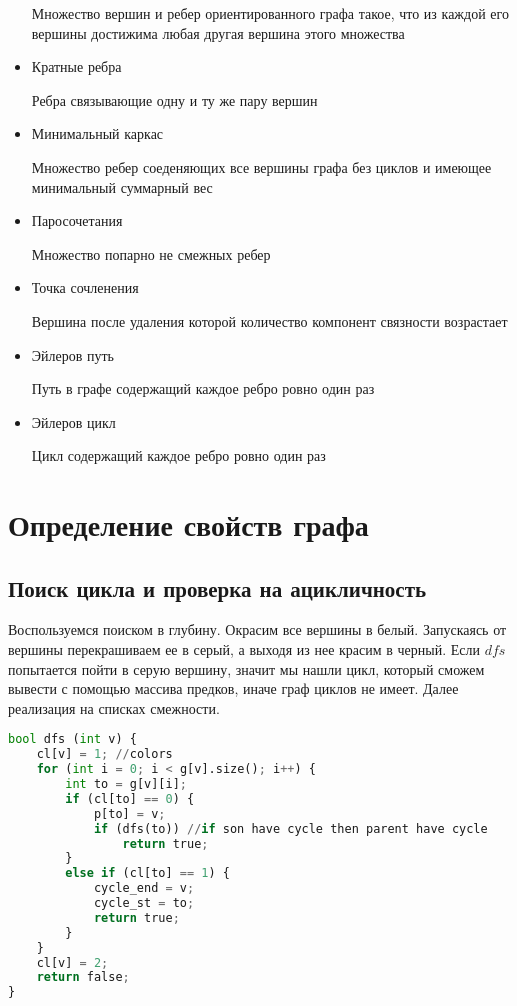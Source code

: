\begin{itemize}
    \begin{mydef}
        Множество вершин и ребер ориентированного графа такое, что из каждой его           вершины достижима любая другая вершина этого множества
    \end{mydef}
\item     
    Кратные ребра
    \begin{mydef}
        Ребра связывающие одну и ту же пару вершин
    \end{mydef}
\item     
    Минимальный каркас
    \begin{mydef}
        Множество ребер соеденяющих все вершины графа без циклов и имеющее               минимальный суммарный вес
    \end{mydef}
\item     
    Паросочетания
    \begin{mydef}
        Множество попарно не смежных ребер
    \end{mydef}
\item     
    Точка сочленения
    \begin{mydef}
        Вершина после удаления которой количество компонент связности возрастает
    \end{mydef}
\item     
    Эйлеров путь
    \begin{mydef}
        Путь в графе содержащий каждое ребро ровно один раз
    \end{mydef}
\item     
    Эйлеров цикл
    \begin{mydef}
        Цикл содержащий каждое ребро ровно один раз
    \end{mydef}
\end{itemize}
\section{Определение свойств графа}
\subsection{Поиск цикла и проверка на ацикличность}
Воспользуемся поиском в глубину. Окрасим все вершины в белый. Запускаясь от вершины перекрашиваем ее в серый, а выходя из нее красим в черный. Если ${dfs}$ попытается пойти в серую вершину, значит мы нашли цикл, который сможем вывести с помощью массива предков, иначе граф циклов не имеет. Далее реализация на списках смежности.
\begin{lstlisting}[language=Python]
bool dfs (int v) {
	cl[v] = 1; //colors
	for (int i = 0; i < g[v].size(); i++) {
		int to = g[v][i];
		if (cl[to] == 0) {
			p[to] = v; 
			if (dfs(to)) //if son have cycle then parent have cycle
			    return true;
		}
		else if (cl[to] == 1) {
			cycle_end = v;
			cycle_st = to;
			return true;
		}
	}
	cl[v] = 2;
	return false;
}
\end{lstlisting}
